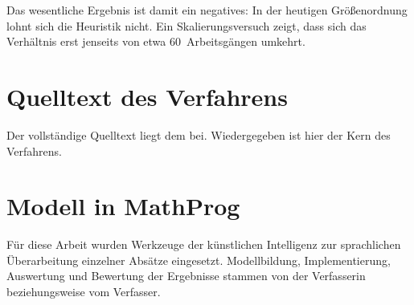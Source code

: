 \documentclass[german,libertinus,logo]{nxtthesis}
\begin{document}
Das wesentliche Ergebnis ist damit ein negatives: In der heutigen
Größenordnung lohnt sich die Heuristik nicht. Ein Skalierungsversuch
zeigt, dass sich das Verhältnis erst jenseits von etwa 60~Arbeitsgängen
umkehrt.

\tableofcontents
\listoftables
\listoffigures
\printacronyms
\printsymbols

\hauptteil









\printbibliography[heading=bibintoc]

\appendix

\chapter{Quelltext des Verfahrens}
\label{anh:quelltext}

Der vollständige Quelltext liegt dem  bei.
Wiedergegeben ist hier der Kern des Verfahrens.



\chapter{Modell in MathProg}
\label{anh:mathprog}



\printindex


Für diese Arbeit wurden Werkzeuge der künstlichen Intelligenz zur
sprachlichen Überarbeitung einzelner Absätze eingesetzt. Modellbildung,
Implementierung, Auswertung und Bewertung der Ergebnisse stammen von der
Verfasserin beziehungsweise vom Verfasser.

\end{document}
